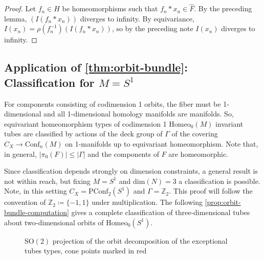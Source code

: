 \documentclass[10pt, oneside]{article}
\newcommand{\Z}{\mathbb{Z}}
\newcommand{\SO}[1][2]{\text{SO}(#1)}
\newcommand{\homeo}[1][S^1]{\text{Homeo}_0(#1)}
\newcommand{\conf}[2][S^1]{\text{Conf}_{#2}(#1)}
\newcommand{\pconf}[2][S^1]{\text{PConf}_{#2}(#1)}
\theoremstyle{definition}
\theoremstyle{definition}
\begin{document}
\begin{proof}
    Let $f_n\in H$ be homeomorphisms such that $f_n*x_n\in \hat{F}$. By the preceding lemma, $(I(f_n*x_n))$ diverges to infinity. By equivariance, $I(x_n) = \rho(f_n^{-1})(I(f_n*x_n))$, so by the preceding note $I(x_n)$ diverges to infinity.
\end{proof}

\subsection{Application of \texorpdfstring{\cref{thm:orbit-bundle}}{Weak Tube Theorem}: Classification for \texorpdfstring{$M=S^1$}{M=S\string^1}}\label{subsec:example-orbit-bundle-classif}
For components consisting of codimension 1 orbits,
the fiber must be 1-dimensional
and all 1-dimensional homology manifolds are manifolds.
So,
equivariant homeomorphism types of codimension 1 $\homeo[M]$ invariant tubes are classified
by actions of the deck group of $\Gamma$
of the covering $C_X \to \conf[M]{n}$ on 1-manifolds
up to equivariant homeomorphism.
Note that,
in general, $\lvert \pi_0(F) \rvert \leq \lvert \Gamma \rvert$
and the components of $F$ are homeomorphic.

Since classification depends strongly on dimension constraints, a general result is not within reach,
but fixing $M = S^1$
and $\text{dim}(N)=3$ a classification is possible.
Note, in this setting $C_X = \pconf{2}$ and $\Gamma = \Z_2$. This proof will follow the convention of $\Z_2 \coloneqq \{-1, 1\}$ under multiplication. The following \cref{prop:orbit-bundle-computation} gives a complete classification of three-dimensional tubes about two-dimensional orbits of $\homeo$.

\begin{figure}
    \centering
    
    \caption{$\SO$ projection of the orbit decomposition of the exceptional tubes types, cone points marked in red}
    \label{fig:orbit-bundle-bases}
\end{figure}
\end{document}

